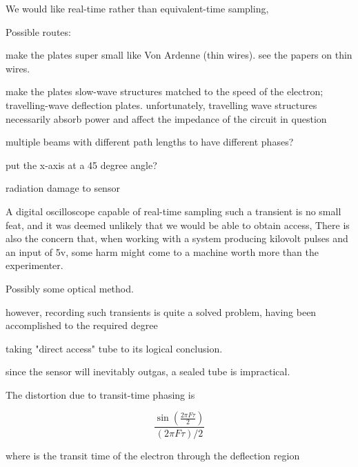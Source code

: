 

We would like real-time rather than equivalent-time sampling, 


Possible routes:

make the plates super small like Von Ardenne (thin wires). see the papers on thin wires.

make the plates slow-wave structures matched to the speed of the electron; travelling-wave deflection plates.
unfortunately, travelling wave structures necessarily absorb power and affect the impedance of the circuit in question


multiple beams with different path lengths to have different phases?

put the x-axis at a 45 degree angle?


radiation damage to sensor 

A digital oscilloscope capable of real-time sampling such a transient is no small feat, and it was deemed unlikely that we would be 
able to obtain access, There is also the concern that, when working with a system producing kilovolt 
pulses and an input of 5v, some harm might come to a machine worth more than the experimenter.

Possibly some optical method. 

however, recording such transients is quite a solved problem, having been accomplished to the required degree 

taking "direct access" tube to its logical conclusion.

since the sensor will inevitably outgas, a sealed tube is impractical.


The distortion due to transit-time phasing is

$$ \frac{\sin(\frac{2\pi F \tau}{2})}{(2\pi F \tau)/2} $$

where \tau is the transit time of the electron through the deflection region 
